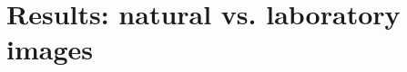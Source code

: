 \documentclass[10pt,handout]{beamer}%
\begin{document}
\section{Results: natural vs. laboratory images}%

%
\end{document}
